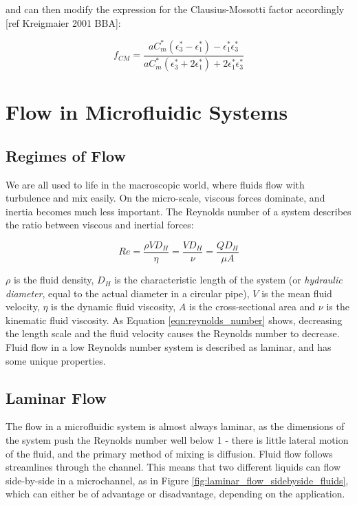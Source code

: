 and can then modify the expression for the Clausius-Mossotti factor accordingly [ref Kreigmaier 2001 BBA]:

\begin{equation}
 f_{CM}=\frac{aC_{m}^{*} \left ( \epsilon_{3}^{*} - \epsilon_{1}^{*}  \right ) - \epsilon_{1}^{*}\epsilon_{3}^{*}}{aC_{m}^{*} \left ( \epsilon_{3}^{*} +2 \epsilon_{1}^{*}  \right ) +2 \epsilon_{1}^{*}\epsilon_{3}^{*}}
\label{CM_thin_membrane}
\end{equation}


\section{Flow in Microfluidic Systems}
\label{sec:flow_in_microfluidic_systems}
\subsection{Regimes of Flow}

We are all used to life in the macroscopic world, where fluids flow with turbulence and mix easily. On the micro-scale, viscous forces dominate, and inertia becomes much less important. The Reynolds number of a system describes the ratio between viscous and inertial forces:

\begin{equation}
 Re = \frac{\rho V D_{H}}{\eta} = \frac{V D_{H}}{\nu} = \frac{Q D_{H}}{\mu A}
\label{eqn:reynolds_number}
\end{equation}


$\rho$ is the fluid density, $D_{H}$ is the characteristic length of the system (or \textit{hydraulic diameter}, equal to the actual diameter in a circular pipe), $V$ is the mean fluid velocity, $\eta$ is the dynamic fluid viscosity, $A$ is the cross-sectional area and $\nu$ is the kinematic fluid viscosity. As Equation \ref{eqn:reynolds_number} shows, decreasing the length scale and the fluid velocity causes the Reynolds number to decrease. Fluid flow in a low Reynolds number system is described as laminar, and has some unique properties.

\subsection{Laminar Flow}

The flow in a microfluidic system is almost always laminar, as the dimensions of the system push the Reynolds number well below 1 - there is little lateral motion of the fluid, and the primary method of mixing is diffusion. Fluid flow follows streamlines through the channel. This means that two different liquids can flow side-by-side in a microchannel, as in Figure \ref{fig:laminar_flow_sidebyside_fluids}, which can either be of advantage or disadvantage, depending on the application.

